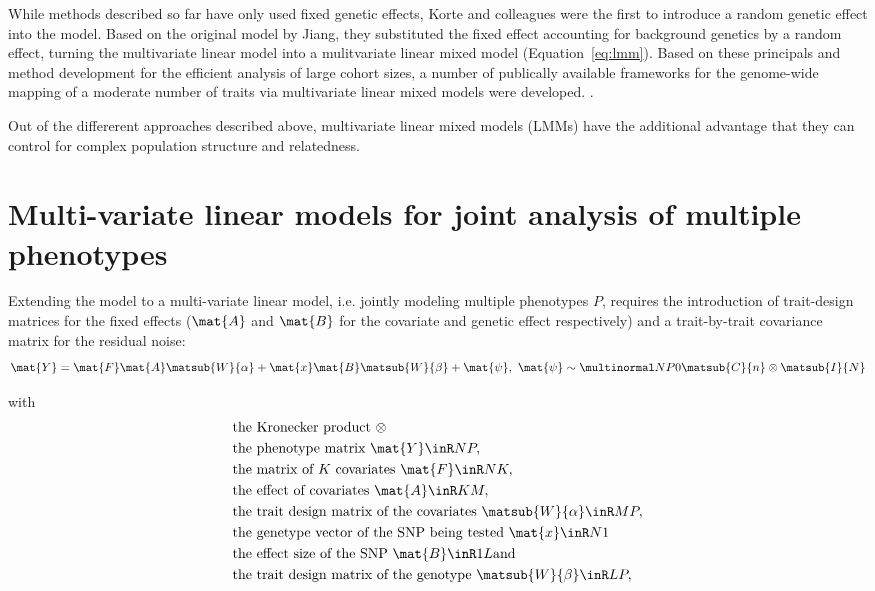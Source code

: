 While methods described so far have only used fixed genetic effects, Korte and colleagues \citeyear{Korte2012} were the first to introduce a random genetic effect into the model. Based on the original model by Jiang, they substituted the fixed effect accounting for background genetics by a random effect, turning the multivariate linear model into a mulitvariate linear mixed model (Equation~\ref{eq:lmm}). Based on these principals and method development for the efficient analysis of large cohort sizes, a number of publically available frameworks for the genome-wide mapping of a moderate number of traits via multivariate linear mixed models were developed. \citep{Korte2012,Yang2011,Lippert2014,Zhou2014,Casale2015}. 

Out of the differerent approaches described above, multivariate linear mixed models (LMMs) have the additional advantage that they can control for complex population structure and relatedness. 

\section{Multi-variate linear models for joint analysis of multiple phenotypes}
Extending the model to a multi-variate linear model, i.e. jointly modeling multiple phenotypes \(P\), requires the introduction of trait-design matrices for the fixed effects (\(\mat{A}\) and \(\mat{B}\) for the covariate and genetic effect respectively) and a trait-by-trait covariance matrix  for the residual noise:
\begin{equation}
\mat{Y} =\mat{F}\mat{A}\matsub{W}{\alpha} +\mat{x}\mat{B}\matsub{W}{\beta} + \mat{\psi},\text{ }
\mat{\psi}\sim \multinormal N P 0 {\matsub{C}{n} \otimes\matsub{I}{N}}
\label{eq:lm-mv}
\end{equation}

with
\begin{align*} 
& \text{the Kronecker product } \otimes \\
& \text{the phenotype matrix }\mat{Y} \inR N P,\\
& \text{the matrix of $K$ covariates }\mat{F} \inR N K,\\
& \text{the effect of covariates } \mat{A} \inR K M,\\
& \text{the trait design matrix of the covariates }\matsub{W}{\alpha} \inR M P,\\
& \text{the genetype vector of the SNP being tested }\mat{x} \inR N 1\\
& \text{the effect size of the SNP } \mat{B} \inR 1 L \text{and}\\
& \text{the trait design matrix of the genotype }\matsub{W}{\beta} \inR L P,\\
\end{align*} 

